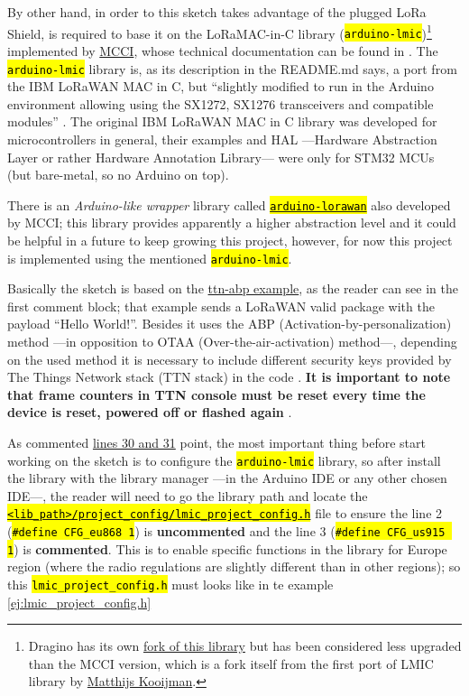 \documentclass[11pt,a4paper,dvipsnames,twoside]{article}
\newcommand{\cmd}[1] {\hl{\texttt{#1}}}
\begin{document}
By other hand, in order to this sketch takes advantage of the plugged LoRa Shield, is required to base it on the LoRaMAC-in-C library \cite{MCCI_lmic} (\cmd{arduino-lmic})\footnote{Dragino has its own \href{https://github.com/dragino/arduino-lmic}{fork of this library} but has been considered less upgraded than the MCCI version, which is a fork itself from the first port of LMIC library by \href{https://github.com/matthijskooijman}{Matthijs Kooijman}.} implemented by \href{https://mcci.com/}{MCCI}, whose technical documentation can be found in \cite{MCCI_lmic_docs}. The \cmd{arduino-lmic} library is, as its description in the README.md says, a port from the IBM LoRaWAN MAC in C, but \enquote{slightly modified to run in the Arduino environment allowing using the SX1272, SX1276 transceivers and compatible modules} \cite{MCCI_lmic}. The original IBM LoRaWAN MAC in C library was developed for microcontrollers in general, their examples and HAL ---Hardware Abstraction Layer or rather Hardware Annotation Library--- were only for STM32 MCUs (but bare-metal, so no Arduino on top). 

There is an \textit{Arduino-like wrapper} library called \href{https://github.com/mcci-catena/arduino-lorawan}{\cmd{arduino-lorawan}} also developed by MCCI; this library provides apparently a higher abstraction level and it could be helpful in a future to keep growing this project, however, for now this project is implemented using the mentioned \cmd{arduino-lmic}.

Basically the sketch is based on the \href{https://github.com/mcci-catena/arduino-lmic/blob/master/examples/ttn-abp/ttn-abp.ino}{ttn-abp example}, as the reader can see in the first comment block; that example sends a LoRaWAN valid package with the payload \enquote{Hello World!}. Besides it uses the ABP (Activation-by-personalization) method ---in opposition to OTAA (Over-the-air-activation) method---, depending on the used method it is necessary to include different security keys provided by The Things Network stack (TTN stack) in the code \cite{TTN_Security}. \textbf{It is important to note that frame counters in TTN console must be reset every time the device is reset, powered off or flashed again} \cite{TTN_frame_counters}.

As commented \href{https://github.com/mcci-catena/arduino-lmic/blob/master/examples/ttn-abp/ttn-abp.ino#L30}{lines 30 and 31} point, the most important thing before start working on the sketch is to configure the \cmd{arduino-lmic} library, so after install the library with the library manager ---in the Arduino IDE or any other chosen IDE---, the reader will need to go the library path and locate the \href{https://github.com/mcci-catena/arduino-lmic/blob/master/project_config/lmic_project_config.h}{\cmd{<lib\_path>/project\_config/lmic\_project\_config.h}} file to ensure the line 2 (\cmd{\#define CFG\_eu868 1}) is \textbf{uncommented} and the line 3 (\cmd{\#define CFG\_us915 1}) is \textbf{commented}. This is to enable specific functions in the library for Europe region (where the radio regulations are slightly different than in other regions); so this \cmd{lmic\_project\_config.h} must looks like in te example \ref{ej:lmic_project_config.h}
\end{document}
